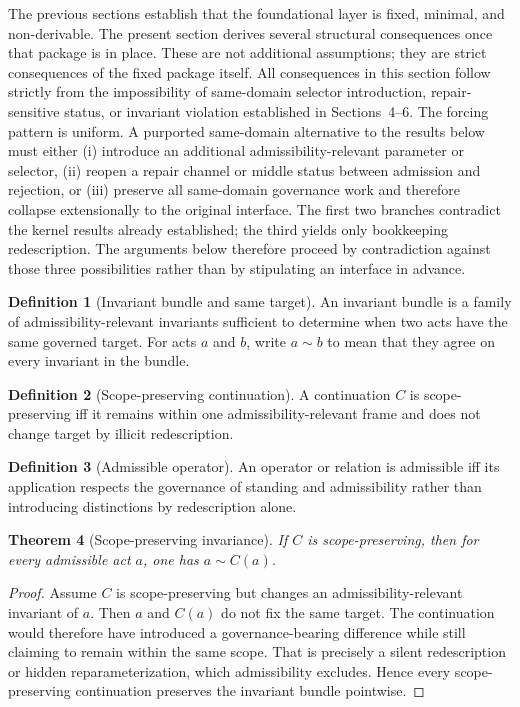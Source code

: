 \documentclass[11pt]{article}
\newtheorem{theorem}{Theorem}[section]
\theoremstyle{definition}
\newtheorem{definition}[theorem]{Definition}
\theoremstyle{remark}
\begin{document}
The previous sections establish that the foundational layer is fixed, minimal, and non-derivable. The present section derives several structural consequences once that package is in place. These are not additional assumptions; they are strict consequences of the fixed package itself. All consequences in this section follow strictly from the impossibility of same-domain selector introduction, repair-sensitive status, or invariant violation established in Sections~4--6. The forcing pattern is uniform. A purported same-domain alternative to the results below must either (i) introduce an additional admissibility-relevant parameter or selector, (ii) reopen a repair channel or middle status between admission and rejection, or (iii) preserve all same-domain governance work and therefore collapse extensionally to the original interface. The first two branches contradict the kernel results already established; the third yields only bookkeeping redescription. The arguments below therefore proceed by contradiction against those three possibilities rather than by stipulating an interface in advance.

\begin{definition}[Invariant bundle and same target]
An invariant bundle is a family of admissibility-relevant invariants sufficient to determine when two acts have the same governed target. For acts $a$ and $b$, write $a \sim b$ to mean that they agree on every invariant in the bundle.
\end{definition}

\begin{definition}[Scope-preserving continuation]
A continuation $C$ is scope-preserving iff it remains within one admissibility-relevant frame and does not change target by illicit redescription.
\end{definition}

\begin{definition}[Admissible operator]
An operator or relation is admissible iff its application respects the governance of standing and admissibility rather than introducing distinctions by redescription alone.
\end{definition}

\begin{theorem}[Scope-preserving invariance]\label{thm:scope-preserving-invariance}
If $C$ is scope-preserving, then for every admissible act $a$, one has $a \sim C(a)$.
\end{theorem}

\begin{proof}
Assume $C$ is scope-preserving but changes an admissibility-relevant invariant of $a$. Then $a$ and $C(a)$ do not fix the same target. The continuation would therefore have introduced a governance-bearing difference while still claiming to remain within the same scope. That is precisely a silent redescription or hidden reparameterization, which admissibility excludes. Hence every scope-preserving continuation preserves the invariant bundle pointwise.
\end{proof}
\end{document}
